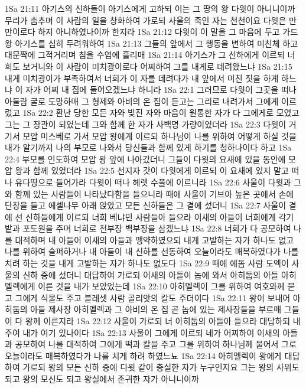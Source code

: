 1Sa 21:11  아기스의 신하들이 아기스에게 고하되 이는 그 땅의 왕 다윗이 아니니이까 무리가 춤추며 이 사람의 일을 창화하여 가로되 사울의 죽인 자는 천천이요 다윗은 만만이로다 하지 아니하였나이까 한지라
1Sa 21:12  다윗이 이 말을 그 마음에 두고 가드 왕 아기스를 심히 두려워하여
1Sa 21:13  그들의 앞에서 그 행동을 변하여 미친체 하고 대문짝에 그적거리며 침을 수염에 흘리매
1Sa 21:14  아기스가 그 신하에게 이르되 너희도 보거니와 이 사람이 미치광이로다 어찌하여 그를 내게로 데려왔느냐
1Sa 21:15  내게 미치광이가 부족하여서 너희가 이 자를 데려다가 내 앞에서 미친 짓을 하게 하느냐 이 자가 어찌 내 집에 들어오겠느냐 하니라
1Sa 22:1  그러므로 다윗이 그곳을 떠나 아둘람 굴로 도망하매 그 형제와 아비의 온 집이 듣고는 그리로 내려가서 그에게 이르렀고
1Sa 22:2  환난 당한 모든 자와 빚진 자와 마음이 원통한 자가 다 그에게로 모였고 그는 그 장관이 되었는데 그와 함께 한 자가 사백명 가량이었더라
1Sa 22:3  다윗이 거기서 모압 미스베로 가서 모압 왕에게 이르되 하나님이 나를 위하여 어떻게 하실 것을 내가 알기까지 나의 부모로 나와서 당신들과 함께 있게 하기를 청하나이다 하고
1Sa 22:4  부모를 인도하여 모압 왕 앞에 나아갔더니 그들이 다윗의 요새에 있을 동안에 모압 왕과 함께 있었더라
1Sa 22:5  선지자 갓이 다윗에게 이르되 이 요새에 있지 말고 떠나 유다땅으로 들어가라 다윗이 떠나 헤렛 수풀에 이르니라
1Sa 22:6  사울이 다윗과 그와 함께 있는 사람들이 나타났다함을 들으니라 때에 사울이 기브아 높은 곳에서 손에 단창을 들고 에셀나무 아래 앉았고 모든 신하들은 그 곁에 섰더니
1Sa 22:7  사울이 곁에 선 신하들에게 이르되 너희 베냐민 사람들아 들으라 이새의 아들이 너희에게 각기 밭과 포도원을 주며 너희로 천부장 백부장을 삼겠느냐
1Sa 22:8  너희가 다 공모하여 나를 대적하며 내 아들이 이새의 아들과 맹약하였으되 내게 고발하는 자가 하나도 없고 나를 위하여 슬퍼하거나 내 아들이 내 신하를 선동하여 오늘이라도 매복하였다가 나를 치려 하는 것을 내게 고발하는 자가 하나도 없도다
1Sa 22:9  때에 에돔 사람 도엑이 사울의 신하 중에 섰더니 대답하여 가로되 이새의 아들이 놉에 와서 아히둡의 아들 아히멜렉에게 이른 것을 내가 보았었는데
1Sa 22:10  아히멜렉이 그를 위하여 여호와께 묻고 그에게 식물도 주고 블레셋 사람 골리앗의 칼도 주더이다
1Sa 22:11  왕이 보내어 아히둡의 아들 제사장 아히멜렉과 그 아비의 온 집 곧 놉에 있는 제사장들을 부르매 그들이 다 왕께 이른지라
1Sa 22:12  사울이 가로되 너 아히둡의 아들아 들으라 대답하되 내 주여 내가 여기 있나이다
1Sa 22:13  사울이 그에게 이르되 네가 어찌하여 이새의 아들과 공모하여 나를 대적하여 그에게 떡과 칼을 주고 그를 위하여 하나님께 물어서 그로 오늘이라도 매복하였다가 나를 치게 하려 하였느뇨
1Sa 22:14  아히멜렉이 왕에게 대답하여 가로되 왕의 모든 신하 중에 다윗 같이 충실한 자가 누구인지요 그는 왕의 사위도 되고 왕의 모신도 되고 왕실에서 존귀한 자가 아니니이까
